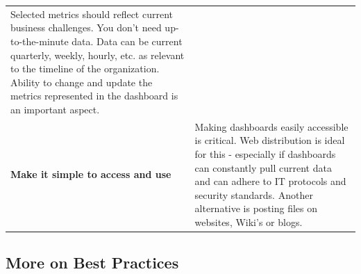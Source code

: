 \documentclass[]{book}
\begin{document}
\begin{longtable}[]{@{}ll@{}}
\begin{minipage}[t]{0.77\columnwidth}
Selected metrics should reflect current business challenges. You don't need up-to-the-minute data. Data can be current quarterly, weekly, hourly, etc. as relevant to the timeline of the organization. Ability to change and update the metrics represented in the dashboard is an important aspect.\strut
\end{minipage}\tabularnewline
\begin{minipage}[t]{0.17\columnwidth}\raggedright
\textbf{Make it simple to access and use}\strut
\end{minipage} & \begin{minipage}[t]{0.77\columnwidth}\raggedright
Making dashboards easily accessible is critical. Web distribution is ideal for this - especially if dashboards can constantly pull current data and can adhere to IT protocols and security standards. Another alternative is posting files on websites, Wiki's or blogs.\strut
\end{minipage}\tabularnewline
\bottomrule
\end{longtable}

\hypertarget{more-on-best-practices}{%
\subsection{More on Best Practices}\label{more-on-best-practices}}
\end{document}
